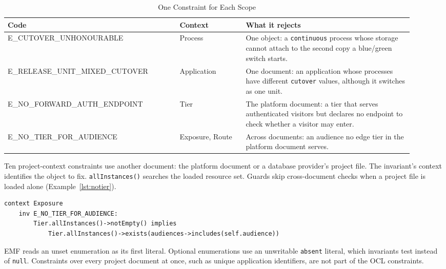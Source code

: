 \begin{table}[!htbp]
\centering
\footnotesize
\begin{tabular}{>{\raggedright\arraybackslash}p{0.39\linewidth}>{\raggedright\arraybackslash}p{0.15\linewidth}>{\raggedright\arraybackslash}p{0.38\linewidth}}
\hline
\textbf{Code} & \textbf{Context} & \textbf{What it rejects} \\
\hline
E\_CUTOVER\_UNHONOURABLE & Process & One object: a \texttt{continuous} process whose storage cannot attach to the second copy a blue/green switch starts. \\
E\_RELEASE\_UNIT\_MIXED\_CUTOVER & Application & One document: an application whose processes have different \texttt{cutover} values, although it switches as one unit. \\
E\_NO\_FORWARD\_AUTH\_ENDPOINT & Tier & The platform document: a tier that serves authenticated visitors but declares no endpoint to check whether a visitor may enter. \\
E\_NO\_TIER\_FOR\_AUDIENCE & Exposure, Route & Across documents: an audience no edge tier in the platform document serves. \\
\hline
\end{tabular}
\caption{One Constraint for Each Scope}
\label{tab:constraints-sample}
\end{table}

Ten project-context constraints use another document: the platform document or
a database provider's project file. The invariant's context identifies the
object to fix. \texttt{allInstances()} searches the loaded resource set. Guards
skip cross-document checks when a project file is loaded alone
(Example~\ref{lst:notier}).

\begin{lstlisting}[style=report, language=ocl, basicstyle=\footnotesize\ttfamily,
                   caption={E\_NO\_TIER\_FOR\_AUDIENCE, with a guard for a project file loaded alone},
                   label={lst:notier}]
context Exposure
    inv E_NO_TIER_FOR_AUDIENCE:
        Tier.allInstances()->notEmpty() implies
            Tier.allInstances()->exists(audiences->includes(self.audience))
\end{lstlisting}

EMF reads an unset enumeration as its first literal. Optional enumerations use
an unwritable \texttt{absent} literal, which invariants test instead of
\texttt{null}. Constraints over every project document at once, such as unique
application identifiers, are not part of the OCL constraints.

